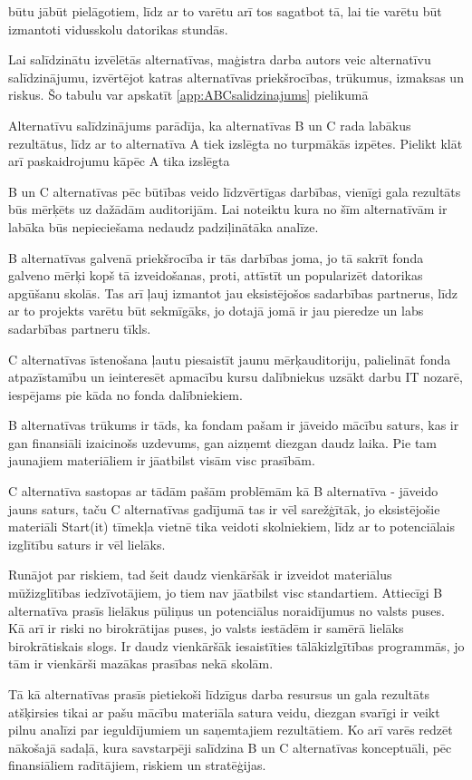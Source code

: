 būtu jābūt pielāgotiem, līdz ar to varētu arī tos sagatbot tā, lai tie varētu būt izmantoti vidusskolu datorikas
stundās.
\par
Lai salīdzinātu izvēlētās alternatīvas, maģistra darba autors veic alternatīvu salīdzinājumu,
izvērtējot katras alternatīvas priekšrocības, trūkumus, izmaksas un riskus. Šo tabulu var apskatīt \ref{app:ABCsalidzinajums} pielikumā
\par 
Alternatīvu salīdzinājums parādīja, ka alternatīvas B un C rada labākus rezultātus, līdz ar to alternatīva A tiek
izslēgta no turpmākās izpētes.
Pielikt klāt arī paskaidrojumu kāpēc A tika izslēgta
\par
B un C alternatīvas pēc būtības veido līdzvērtīgas darbības, vienīgi gala rezultāts būs mērķēts uz dažādām
auditorijām. Lai noteiktu kura no šīm alternatīvām ir labāka būs nepieciešama nedaudz padziļinātāka analīze.
\par
B alternatīvas galvenā priekšrocība ir tās darbības joma, jo tā sakrīt fonda galveno mērķi kopš tā izveidošanas, proti,
attīstīt un popularizēt datorikas apgūšanu skolās. Tas arī ļauj izmantot jau eksistējošos sadarbības partnerus,
līdz ar to projekts varētu būt sekmīgāks, jo dotajā jomā ir jau pieredze un labs sadarbības partneru tīkls.
\par
C alternatīvas īstenošana ļautu piesaistīt jaunu mērķauditoriju, palielināt fonda atpazīstamību un ieinteresēt
apmacību kursu dalībniekus uzsākt darbu IT nozarē, iespējams pie kāda no fonda dalībniekiem.
\par
B alternatīvas trūkums ir tāds, ka fondam pašam ir jāveido mācību saturs, kas ir gan finansiāli izaicinošs 
uzdevums, gan aizņemt diezgan daudz laika. Pie tam jaunajiem materiāliem ir jāatbilst visām \acrshort{visc}
prasībām.
\par
C alternatīva sastopas ar tādām pašām problēmām kā B alternatīva - jāveido jauns saturs, taču C alternatīvas gadījumā
tas ir vēl sarežģītāk, jo eksistējošie materiāli Start(it) tīmekļa vietnē tika veidoti skolniekiem, līdz ar to
potenciālais izglītību saturs ir vēl lielāks.
\par
Runājot par riskiem, tad šeit daudz vienkāršāk ir izveidot materiālus mūžizglītības iedzīvotājiem, jo tiem
nav jāatbilst \acrshort{visc} standartiem. Attiecīgi B alternatīva prasīs lielākus pūliņus un potenciālus noraidījumus no
valsts puses. Kā arī ir riski no birokrātijas puses, jo valsts iestādēm ir samērā lielāks birokrātiskais slogs. Ir daudz
vienkāršāk iesaistīties tālākizlgītības programmās, jo tām ir vienkārši mazākas prasības nekā skolām.
\par
Tā kā alternatīvas prasīs pietiekoši līdzīgus darba resursus un gala rezultāts atšķirsies tikai ar pašu mācību materiāla
satura veidu, diezgan svarīgi ir veikt pilnu analīzi par ieguldījumiem un saņemtajiem rezultātiem. Ko arī varēs redzēt
nākošajā sadaļā, kura savstarpēji salīdzina B un C alternatīvas konceptuāli, pēc finansiāliem radītājiem, riskiem un stratēģijas.

